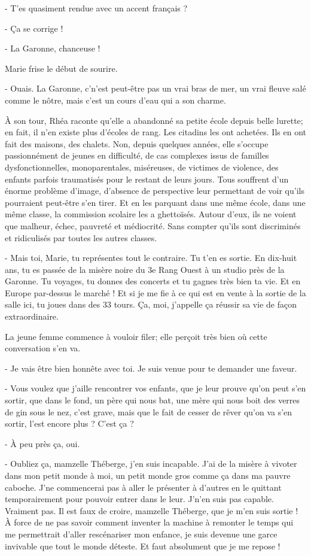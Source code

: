 - T’es quasiment rendue avec un accent français ?

- Ça se corrige !

- La Garonne, chanceuse !

Marie frise le début de sourire.

- Ouais. La Garonne, c’n’est peut-être pas un vrai bras de mer, un vrai fleuve salé comme le nôtre, mais c’est un cours d’eau qui a son charme.

À son tour, Rhéa raconte qu’elle a abandonné sa petite école depuis belle lurette; en fait, il n’en existe plus d’écoles de rang. Les citadins les ont achetées. Ils en ont fait des maisons, des chalets. Non, depuis quelques années, elle s’occupe passionnément de jeunes en difficulté, de cas complexes issus de familles dysfonctionnelles, monoparentales, miséreuses, de victimes de violence, des enfants parfois traumatisés pour le restant de leurs jours. Tous souffrent d’un énorme problème d’image, d’absence de perspective leur permettant de voir qu’ils pourraient peut-être s’en tirer. Et en les parquant dans une même école, dans une même classe, la commission scolaire les a ghettoïsés. Autour d’eux, ils ne voient que malheur, échec, pauvreté et médiocrité. Sans compter qu’ils sont discriminés et ridiculisés par toutes les autres classes.

- Mais toi, Marie, tu représentes tout le contraire. Tu t’en es sortie. En dix-huit ans, tu es passée de la misère noire du 3e Rang Ouest à un studio près de la Garonne. Tu voyages, tu donnes des concerts et tu gagnes très bien ta vie. Et en Europe par-dessus le marché ! Et si je me fie à ce qui est en vente à la sortie de la salle ici, tu joues dans des 33 tours. Ça, moi, j’appelle ça réussir sa vie de façon extraordinaire.

La jeune femme commence à vouloir filer; elle perçoit très bien où cette conversation s’en va.

- Je vais être bien honnête avec toi. Je suis venue pour te demander une faveur.

- Vous voulez que j’aille rencontrer vos enfants, que je leur prouve qu’on peut s’en sortir, que dans le fond, un père qui nous bat, une mère qui nous boit des verres de gin sous le nez, c’est grave, mais que le fait de cesser de rêver qu’on va s’en sortir, l’est encore plus ? C’est ça ?

- À peu près ça, oui.

- Oubliez ça, mamzelle Théberge, j’en suis incapable. J’ai de la misère à vivoter dans mon petit monde à moi, un petit monde gros comme ça dans ma pauvre caboche. J’ne commencerai pas à aller le présenter à d’autres en le quittant temporairement pour pouvoir entrer dans le leur. J’n’en suis pas capable. Vraiment pas. Il est faux de croire, mamzelle Théberge, que je m’en suis sortie ! À force de ne pas savoir comment inventer la machine à remonter le temps qui me permettrait d’aller rescénariser mon enfance, je suis devenue une garce invivable que tout le monde déteste. Et faut absolument que je me repose !

